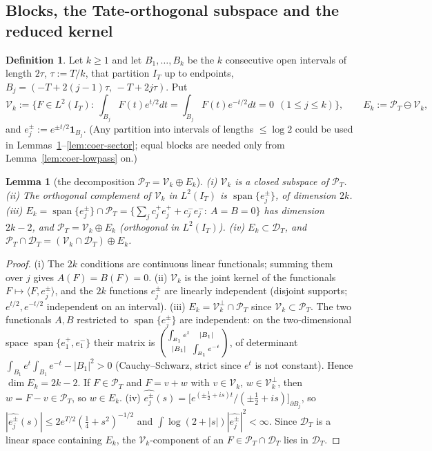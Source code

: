 \documentclass[11pt]{amsart}
\newtheorem{lemma}[theorem]{Lemma}
\theoremstyle{definition}
\newtheorem{definition}[theorem]{Definition}
\theoremstyle{remark}
\newcommand{\PT}{\mathcal P_T}
\newcommand{\IT}{I_T}
\begin{document}
\subsection{Blocks, the Tate-orthogonal subspace and the reduced kernel}\label{subsec:coer-blocks}

\begin{definition}\label{def:coer-V}
Let $k\ge1$ and let $B_1,\dots,B_k$ be the $k$ consecutive open intervals of length $2\tau$,
$\tau:=T/k$, that partition $\IT$ up to endpoints, $B_j=(-T+2(j-1)\tau,\,-T+2j\tau)$. Put
\[
\mathcal V_k:=\Big\{F\in L^2(\IT):\ \int_{B_j}F(t)e^{t/2}dt=\int_{B_j}F(t)e^{-t/2}dt=0\ \ (1\le j\le k)\Big\},
\qquad E_k:=\PT\ominus\mathcal V_k ,
\]
and $e_j^\pm:=e^{\pm t/2}\mathbf 1_{B_j}$. (Any partition into intervals of lengths $\le\log2$ could be
used in Lemmas~\ref{lem:coer-decomp}--\ref{lem:coer-sector}; equal blocks are needed only from
Lemma~\ref{lem:coer-lowpass} on.)
\end{definition}

\begin{lemma}[the decomposition $\PT=\mathcal V_k\oplus E_k$]\label{lem:coer-decomp}
\emph{(i)} $\mathcal V_k$ is a closed subspace of $\PT$. \emph{(ii)} The orthogonal complement of
$\mathcal V_k$ in $L^2(\IT)$ is $\operatorname{span}\{e_j^\pm\}$, of dimension $2k$.
\emph{(iii)} $E_k=\operatorname{span}\{e_j^\pm\}\cap\PT=\{\sum_jc_j^+e_j^++c_j^-e_j^-:\ A=B=0\}$ has
dimension $2k-2$, and $\PT=\mathcal V_k\oplus E_k$ (orthogonal in $L^2(\IT)$).
\emph{(iv)} $E_k\subset\mathcal D_T$, and $\PT\cap\mathcal D_T=(\mathcal V_k\cap\mathcal D_T)\oplus E_k$.
\end{lemma}
\begin{proof}
(i) The $2k$ conditions are continuous linear functionals; summing them over $j$ gives $A(F)=B(F)=0$.
(ii) $\mathcal V_k$ is the joint kernel of the functionals $F\mapsto\langle F,e_j^\pm\rangle$, and the $2k$
functions $e_j^\pm$ are linearly independent (disjoint supports; $e^{t/2},e^{-t/2}$ independent on an
interval). (iii) $E_k=\mathcal V_k^\perp\cap\PT$ since $\mathcal V_k\subset\PT$. The two functionals
$A,B$ restricted to $\operatorname{span}\{e_j^\pm\}$ are independent: on the two-dimensional space
$\operatorname{span}\{e_1^+,e_1^-\}$ their matrix is
$\begin{psmallmatrix}\int_{B_1}e^t&|B_1|\\|B_1|&\int_{B_1}e^{-t}\end{psmallmatrix}$, of determinant
$\int_{B_1}e^t\int_{B_1}e^{-t}-|B_1|^2>0$ (Cauchy--Schwarz, strict since $e^t$ is not constant). Hence
$\dim E_k=2k-2$. If $F\in\PT$ and $F=v+w$ with $v\in\mathcal V_k$, $w\in\mathcal V_k^\perp$, then
$w=F-v\in\PT$, so $w\in E_k$. (iv) $\widehat{e_j^\pm}(s)=\big[e^{(\pm\frac12+is)t}/(\pm\frac12+is)\big]_{\partial B_j}$,
so $|\widehat{e_j^\pm}(s)|\le2e^{T/2}(\frac14+s^2)^{-1/2}$ and $\int\log(2+|s|)|\widehat{e_j^\pm}|^2<\infty$.
Since $\mathcal D_T$ is a linear space containing $E_k$, the $\mathcal V_k$-component of an $F\in\PT\cap\mathcal D_T$
lies in $\mathcal D_T$.
\end{proof}
\end{document}
